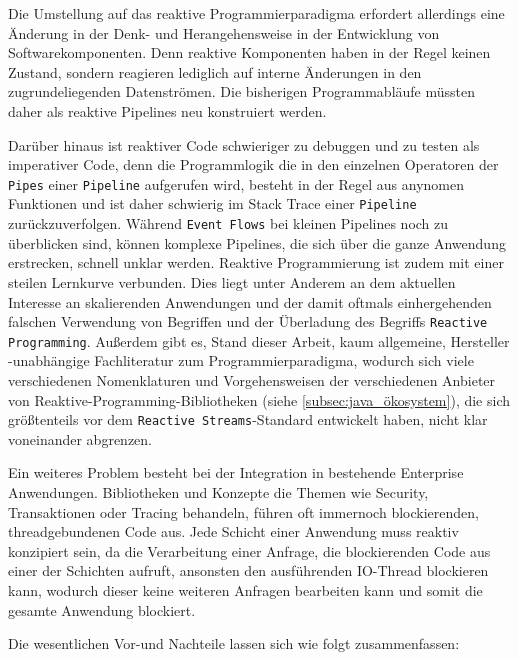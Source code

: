 Die Umstellung auf das reaktive Programmierparadigma erfordert allerdings eine Änderung in der Denk- und Herangehensweise in der
Entwicklung von Softwarekomponenten. Denn reaktive Komponenten haben in der Regel keinen Zustand,
sondern reagieren lediglich auf interne Änderungen in den zugrundeliegenden Datenströmen.
Die bisherigen Programmabläufe müssten daher als reaktive Pipelines neu konstruiert werden.

Darüber hinaus ist reaktiver Code schwieriger zu debuggen und zu testen als imperativer Code, denn die Programmlogik die in den einzelnen Operatoren
der \verb|Pipes| einer \verb|Pipeline| aufgerufen wird, besteht in der Regel aus anynomen Funktionen und ist daher schwierig im Stack Trace einer
\verb|Pipeline| zurückzuverfolgen.
Während \verb|Event Flows| bei kleinen Pipelines noch zu überblicken sind, können komplexe Pipelines, die sich über die ganze Anwendung erstrecken,
schnell unklar werden.
Reaktive Programmierung ist zudem mit einer steilen Lernkurve verbunden. Dies liegt unter Anderem an dem aktuellen Interesse an skalierenden
Anwendungen und der damit oftmals einhergehenden falschen Verwendung von Begriffen und der Überladung des Begriffs \verb|Reactive Programming|.
Außerdem gibt es, Stand dieser Arbeit, kaum allgemeine, Hersteller
-unabhängige Fachliteratur zum Programmierparadigma, wodurch sich viele verschiedenen Nomenklaturen und Vorgehensweisen der verschiedenen Anbieter von
Reaktive-Programming-Bibliotheken (siehe \ref{subsec:java_ökosystem}), die sich größtenteils vor dem \verb|Reactive Streams|-Standard entwickelt haben,
nicht klar voneinander abgrenzen.

Ein weiteres Problem besteht bei der Integration in bestehende Enterprise Anwendungen. Bibliotheken und Konzepte die Themen wie
Security, Transaktionen oder Tracing behandeln, führen oft immernoch blockierenden, threadgebundenen Code aus.
Jede Schicht einer Anwendung muss reaktiv konzipiert sein, da die Verarbeitung einer Anfrage, die blockierenden Code aus einer der
Schichten aufruft, ansonsten den ausführenden IO-Thread blockieren kann, wodurch dieser keine weiteren Anfragen bearbeiten kann und somit die gesamte Anwendung blockiert.

Die wesentlichen Vor-und Nachteile lassen sich wie folgt zusammenfassen:

